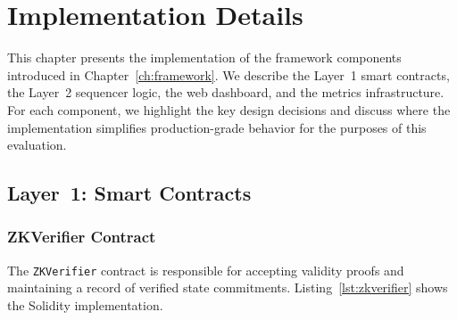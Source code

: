 \documentclass[
]{elteikthesis}[2024/04/26]
\begin{document}
\cleardoublepage

\chapter{Implementation Details}
\label{ch:implementation}

This chapter presents the implementation of the framework components introduced in Chapter~\ref{ch:framework}. We describe the Layer~1 smart contracts, the Layer~2 sequencer logic, the web dashboard, and the metrics infrastructure. For each component, we highlight the key design decisions and discuss where the implementation simplifies production-grade behavior for the purposes of this evaluation.

\section{Layer~1: Smart Contracts}

\subsection{ZKVerifier Contract}

The \texttt{ZKVerifier} contract is responsible for accepting validity proofs and maintaining a record of verified state commitments. Listing~\ref{lst:zkverifier} shows the Solidity implementation.
\end{document}
